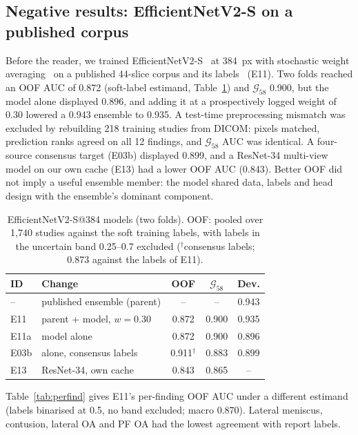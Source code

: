 \documentclass{ieeeaccess}
\newcommand{\gold}{$\mathcal{G}_{58}$}
\begin{document}
\subsection{Negative results: EfficientNetV2-S on a published corpus}
\label{sec:res-own}
Before the reader, we trained EfficientNetV2-S~\cite{tan2021efficientnetv2} at 384~px with stochastic weight
averaging~\cite{izmailov2018swa} on a published 44-slice corpus and its labels~\cite{dread2026raptor} (E11). Two folds
reached an OOF AUC of 0.872 (soft-label estimand, Table~\ref{tab:own}) and \gold{} 0.900, but the model alone displayed
0.896, and adding it at a prospectively logged weight of 0.30 lowered a 0.943 ensemble to 0.935. A test-time preprocessing
mismatch was excluded by rebuilding 218 training studies from DICOM: pixels matched, prediction ranks agreed on all 12
findings, and \gold{} AUC was identical. A four-source consensus target (E03b) displayed 0.899, and a ResNet-34 multi-view
model on our own cache (E13) had a lower OOF AUC (0.843). Better OOF did not imply a useful ensemble member: the model shared
data, labels and head design with the ensemble's dominant component.

\begin{table}[!t]
\centering
\caption{EfficientNetV2-S@384 models (two folds). OOF: pooled over 1,740 studies against the soft training labels, with
labels in the uncertain band 0.25--0.7 excluded ($^{\dagger}$consensus labels; 0.873 against the labels of E11).}
\label{tab:own}
\footnotesize
\setlength{\tabcolsep}{3.5pt}
\begin{tabular}{llccc}
\toprule
ID & Change & OOF & \gold & Dev.\\
\midrule
-- & published ensemble (parent) & -- & -- & 0.943\\
E11 & parent + model, $w=0.30$ & 0.872 & 0.900 & 0.935\\
E11a & model alone & 0.872 & 0.900 & 0.896\\
E03b & alone, consensus labels & 0.911$^{\dagger}$ & 0.883 & 0.899\\
E13 & ResNet-34, own cache & 0.843 & 0.865 & --\\
\bottomrule
\end{tabular}
\end{table}

Table~\ref{tab:perfind} gives E11's per-finding OOF AUC under a different estimand (labels binarised at 0.5, no band
excluded; macro 0.870). Lateral meniscus, contusion, lateral OA and PF OA had the lowest agreement with report labels.
\end{document}

